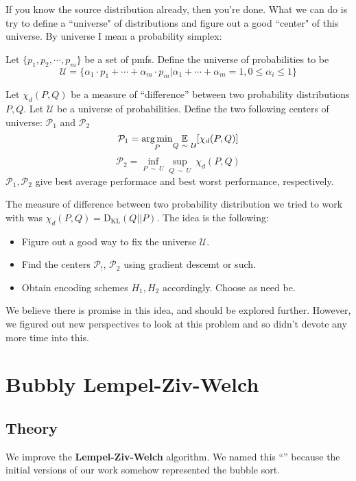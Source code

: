 \documentclass[scrartcl]{article}
\begin{document}
If you know the source distribution already, then you're done. What we can do is try to define a ``universe" of distributions and figure out a good ``center" of this universe. By universe I mean a probability simplex: 

\begin{proposition*}
    Let $\{p_1, p_2, \cdots, p_m\}$ be a set of pmfs. Define the universe of probabilities to be
    $$\mathcal{U} = \Bigg\{\alpha_1 \cdot p_1 + \cdots + \alpha_m \cdot p_m \Bigg| \alpha_1 + \cdots + \alpha_m = 1, 0 \leq \alpha_i \leq 1\Bigg\}$$
\end{proposition*}
\begin{proposition*}
    Let $\chi_d(P,Q)$ be a measure of ``difference'' between two probability distributions $P, Q$. Let $\mathcal{U}$ be a universe of probabilities. Define the two following centers of universe: $\mathcal{P}_{1}$ and $\mathcal{P}_{2}$
    $$\mathcal{P}_1 = \underset{P}{\arg \min} \underset{Q \ \sim \ \mathcal{U}}{\Bbb{E}}[\chi_d(P,Q)]$$
    $$\mathcal{P}_2 = \underset{P \ \sim \ U}{\inf} \underset{Q \ \sim \ U}{\sup} \ \chi_d(P,Q)$$
    $\mathcal{P}_1, \mathcal{P}_2$ give best average performace and best worst performance, respectively.
\end{proposition*}

The measure of difference between two probability distribution we tried to work with was $\chi_d(P,Q) = \operatorname{D_{KL}}(Q || P)$.
The idea is the following:
\begin{itemize}
    \item Figure out a good way to fix the universe $\mathcal{U}$. 
    \item Find the centers $\mathcal{P}_!$, $\mathcal{P}_2$ using gradient descemt or such.
    \item Obtain encoding schemes $H_1, H_2$ accordingly. Choose as need be. 
\end{itemize}
We believe there is promise in this idea, and should be explored further. However, we figured out new perspectives to look at this problem and so didn't devote any more time into this.

\section{Bubbly Lempel-Ziv-Welch}
\subsection{Theory}
We improve the \textbf{Lempel-Ziv-Welch} algorithm. We named this ``'' because the initial versions of our work somehow represented the bubble sort. 
\end{document}
